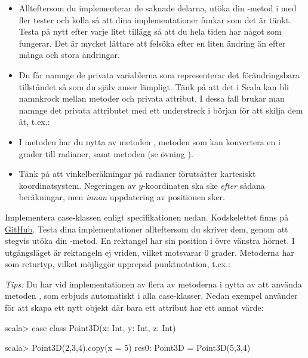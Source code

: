 \begin{itemize}
\item Allteftersom du implementerar de saknade delarna, utöka din -metod i  med fler tester och kolla så att dina implementationer funkar som det är tänkt. Testa på nytt efter varje litet tillägg så att du hela tiden har något som fungerar. Det är mycket lättare att felsöka efter en liten ändring än efter många och stora ändringar.

\item Du får namnge de privata variablerna som representerar det förändringsbara tillståndet så som du själv anser lämpligt. Tänk på att det i Scala kan bli namnkrock mellan metoder och privata attribut. I dessa fall brukar man namnge det privata attributet med ett understreck i början för att skilja dem åt, t.ex.: \\

\item I metoden  har du nytta av metoden , metoden  som kan konvertera en  i grader till radianer, samt metoden  (se övning \texttt{\ExeWeekFIVE}).

\item Tänk på att vinkelberäkningar på radianer förutsätter kartesiskt koordinatsystem. Negeringen av $y$-koordinaten ska ske \emph{efter} sådana beräkningar, men \emph{innan} uppdatering av positionen sker.

\end{itemize}


\Task Implementera case-klassen  enligt specifikationen nedan. Kodskelettet finns på  \href{https://github.com/lunduniversity/introprog/blob/master/workspace/w05_turtle/src/main/scala/graphics/Rect.scala}{GitHub}. Testa dina implementationer allteftersom du skriver dem, genom att stegvis utöka din -metod.
En rektangel har sin position i övre vänstra hörnet. I utgångsläget är rektangeln ej vriden, vilket motsvarar $0$ grader.
Metoderna har  som returtyp, vilket möjliggör upprepad punktnotation, t.ex.:\\


\emph{Tips:} Du har vid implementationen av flera av metoderna i  nytta av att använda metoden , som erbjuds automatiskt i alla case-klasser. Nedan exempel använder  för att skapa ett nytt objekt där bara ett attribut har ett annat värde:
\begin{REPLnonum}
scala> case class Point3D(x: Int, y: Int, z: Int)

scala> Point3D(2,3,4).copy(x = 5)
res0: Point3D = Point3D(5,3,4)
\end{REPLnonum}


